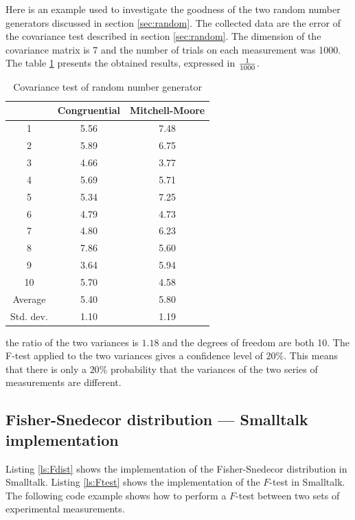  Here is an example used to investigate the
goodness of the two random number generators discussed in section
\ref{sec:random}. The collected data are the error of the
covariance test described in section \ref{sec:random}. The
dimension of the covariance matrix is 7 and the number of trials
on each measurement was 1000. The table \ref{tb:Ftest} presents
the obtained results, expressed in ${1\over 1000}$.
\begin{table}[h]
\vspace{1 ex}
  \centering
  \caption{Covariance test of random number generator}\label{tb:Ftest}
\vspace{1 ex}
  \begin{tabular}{|c|c|c|} \hline
     & Congruential & Mitchell-Moore \\ \hline
    1 & 5.56 & 7.48 \\
    2 & 5.89 & 6.75 \\
    3 & 4.66 & 3.77 \\
    4 & 5.69 & 5.71 \\
    5 & 5.34 & 7.25 \\
    6 & 4.79 & 4.73 \\
    7 & 4.80 & 6.23 \\
    8 & 7.86 & 5.60 \\
    9 & 3.64 & 5.94 \\
    10 & 5.70 & 4.58 \\ \hline
    Average & 5.40 & 5.80 \\
    Std. dev. & 1.10 & 1.19 \\ \hline
  \end{tabular}
\end{table}
the ratio of the two variances is $1.18$ and the degrees of
freedom are both 10. The F-test applied to the two variances gives
a confidence level of $20\%$. This means that there is only a
$20\%$ probability that the variances of the two series of
measurements are different.

\subsection{Fisher-Snedecor distribution --- Smalltalk implementation}
 Listing \ref{ls:Fdist} shows
the implementation of the Fisher-Snedecor distribution in
Smalltalk. Listing \ref{ls:Ftest} shows the implementation of the
$F$-test in Smalltalk. The following code example shows how to
perform a $F$-test between two sets of experimental measurements.

